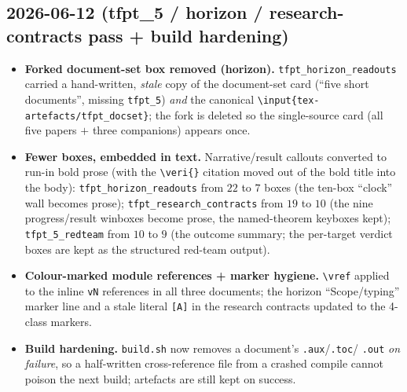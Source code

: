 \documentclass[11pt]{article}
\begin{document}
\subsection*{2026-06-12 (tfpt\_5 / horizon / research-contracts pass + build hardening)}
\begin{itemize}
\item \textbf{Forked document-set box removed (horizon).} \texttt{tfpt\_horizon\_readouts} carried a
  hand-written, \emph{stale} copy of the document-set card (``five short documents'', missing
  \texttt{tfpt\_5}) \emph{and} the canonical \texttt{\textbackslash input\{tex-artefacts/tfpt\_docset\}};
  the fork is deleted so the single-source card (all five papers $+$ three companions) appears once.
\item \textbf{Fewer boxes, embedded in text.} Narrative/result callouts converted to run-in bold prose
  (with the \texttt{\textbackslash veri\{\}} citation moved out of the bold title into the body):
  \texttt{tfpt\_horizon\_readouts} from $22$ to $7$ boxes (the ten-box ``clock'' wall becomes prose);
  \texttt{tfpt\_research\_contracts} from $19$ to $10$ (the nine progress/result winboxes become prose,
  the named-theorem keyboxes kept); \texttt{tfpt\_5\_redteam} from $10$ to $9$ (the outcome summary; the
  per-target verdict boxes are kept as the structured red-team output).
\item \textbf{Colour-marked module references + marker hygiene.} \texttt{\textbackslash vref} applied to
  the inline \texttt{vN} references in all three documents; the horizon ``Scope/typing'' marker line and a
  stale literal \texttt{[A]} in the research contracts updated to the 4-class markers.
\item \textbf{Build hardening.} \texttt{build.sh} now removes a document's \texttt{.aux}/\texttt{.toc}/%
  \texttt{.out} \emph{on failure}, so a half-written cross-reference file from a crashed compile cannot
  poison the next build; artefacts are still kept on success.
\end{itemize}
\end{document}
